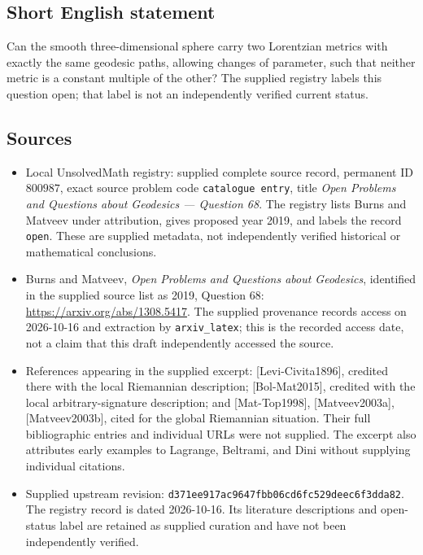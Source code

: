 \documentclass[11pt]{article}
\begin{document}
\subsection{Short English statement}
Can the smooth three-dimensional sphere carry two Lorentzian metrics with exactly the same geodesic paths, allowing changes of parameter, such that neither metric is a constant multiple of the other? The supplied registry labels this question open; that label is not an independently verified current status.
\subsection{Sources}
\begin{itemize}
\item Local UnsolvedMath registry: supplied complete source record, permanent ID \(800987\), exact source problem code \texttt{catalogue entry}, title \emph{Open Problems and Questions about Geodesics --- Question 68}. The registry lists Burns and Matveev under attribution, gives proposed year 2019, and labels the record \texttt{open}. These are supplied metadata, not independently verified historical or mathematical conclusions.
\item Burns and Matveev, \emph{Open Problems and Questions about Geodesics}, identified in the supplied source list as 2019, Question 68: \url{https://arxiv.org/abs/1308.5417}. The supplied provenance records access on 2026-10-16 and extraction by \texttt{arxiv\_latex}; this is the recorded access date, not a claim that this draft independently accessed the source.
\item References appearing in the supplied excerpt: [Levi-Civita1896], credited there with the local Riemannian description; [Bol-Mat2015], credited with the local arbitrary-signature description; and [Mat-Top1998], [Matveev2003a], [Matveev2003b], cited for the global Riemannian situation. Their full bibliographic entries and individual URLs were not supplied. The excerpt also attributes early examples to Lagrange, Beltrami, and Dini without supplying individual citations.
\item Supplied upstream revision: \texttt{d371ee917ac9647fbb06cd6fc529deec6f3dda82}. The registry record is dated 2026-10-16. Its literature descriptions and open-status label are retained as supplied curation and have not been independently verified.
\end{itemize}
\end{document}
